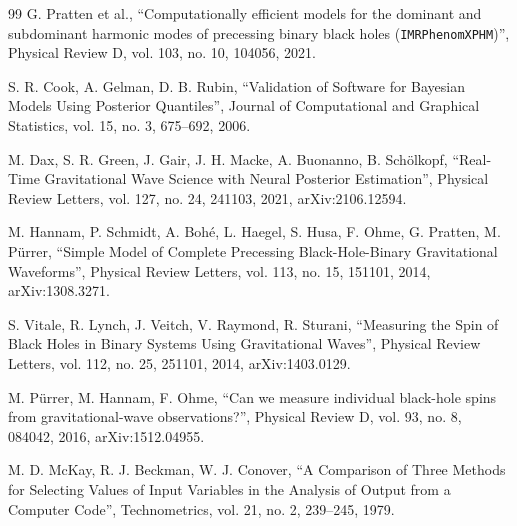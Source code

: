 \documentclass[12pt]{article}
\begin{document}
\begin{thebibliography}{99}
  G. Pratten et al.,
  ``Computationally efficient models for the dominant and subdominant harmonic modes of precessing binary black holes (\texttt{IMRPhenomXPHM})'',
  Physical Review D, vol. 103, no. 10, 104056, 2021.

  S. R. Cook, A. Gelman, D. B. Rubin,
  ``Validation of Software for Bayesian Models Using Posterior Quantiles'',
  Journal of Computational and Graphical Statistics, vol. 15, no. 3, 675--692, 2006.

  M. Dax, S. R. Green, J. Gair, J. H. Macke, A. Buonanno, B. Sch\"olkopf,
  ``Real-Time Gravitational Wave Science with Neural Posterior Estimation'',
  Physical Review Letters, vol. 127, no. 24, 241103, 2021,
  arXiv:2106.12594.

  M. Hannam, P. Schmidt, A. Boh\'e, L. Haegel, S. Husa, F. Ohme, G. Pratten, M. P\"urrer,
  ``Simple Model of Complete Precessing Black-Hole-Binary Gravitational Waveforms'',
  Physical Review Letters, vol. 113, no. 15, 151101, 2014,
  arXiv:1308.3271.

  S. Vitale, R. Lynch, J. Veitch, V. Raymond, R. Sturani,
  ``Measuring the Spin of Black Holes in Binary Systems Using Gravitational Waves'',
  Physical Review Letters, vol. 112, no. 25, 251101, 2014,
  arXiv:1403.0129.

  M. P\"urrer, M. Hannam, F. Ohme,
  ``Can we measure individual black-hole spins from gravitational-wave observations?'',
  Physical Review D, vol. 93, no. 8, 084042, 2016,
  arXiv:1512.04955.

  M. D. McKay, R. J. Beckman, W. J. Conover,
  ``A Comparison of Three Methods for Selecting Values of Input Variables in the Analysis of Output from a Computer Code'',
  Technometrics, vol. 21, no. 2, 239--245, 1979.
\end{thebibliography}
\end{document}
